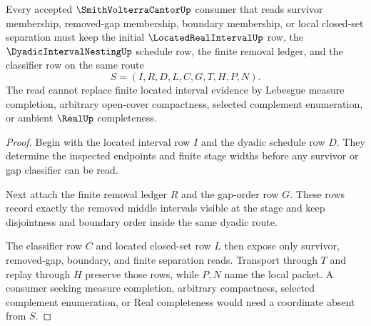 \begin{theorem}
\label{thm:smith-volterra-cantor-located-interval-nonescape}
Every accepted $\SmithVolterraCantorUp$ consumer that reads survivor membership, removed-gap membership, boundary membership, or local closed-set separation must keep the initial $\LocatedRealIntervalUp$ row, the $\DyadicIntervalNestingUp$ schedule row, the finite removal ledger, and the classifier row on the same route
$$
S=(I,R,D,L,C,G,T,H,P,N).
$$
The read cannot replace finite located interval evidence by Lebesgue measure completion, arbitrary open-cover compactness, selected complement enumeration, or ambient $\RealUp$ completeness.
\end{theorem}
\begin{proof}
Begin with the located interval row $I$ and the dyadic schedule row $D$. They determine the inspected endpoints and finite stage widths before any survivor or gap classifier can be read.

Next attach the finite removal ledger $R$ and the gap-order row $G$. These rows record exactly the removed middle intervals visible at the stage and keep disjointness and boundary order inside the same dyadic route.

The classifier row $C$ and located closed-set row $L$ then expose only survivor, removed-gap, boundary, and finite separation reads. Transport through $T$ and replay through $H$ preserve those rows, while $P,N$ name the local packet. A consumer seeking measure completion, arbitrary compactness, selected complement enumeration, or Real completeness would need a coordinate absent from $S$.
\end{proof}




